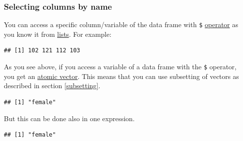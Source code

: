 \documentclass[
]{scrartcl}
\newenvironment{Shaded}{\begin{snugshade}}{\end{snugshade}}
\newcommand{\CommentTok}[1]{\textcolor[rgb]{0.56,0.35,0.01}{\textit{#1}}}
\newcommand{\DecValTok}[1]{\textcolor[rgb]{0.00,0.00,0.81}{#1}}
\newcommand{\NormalTok}[1]{#1}
\newcommand{\OperatorTok}[1]{\textcolor[rgb]{0.81,0.36,0.00}{\textbf{#1}}}
\newcommand{\StringTok}[1]{\textcolor[rgb]{0.31,0.60,0.02}{#1}}
\begin{document}
\hypertarget{selectbyname}{%
\subsubsection{Selecting columns by name}\label{selectbyname}}

You can access a specific column/variable of the data frame with \texttt{\$} \protect\hyperlink{listsdollar}{operator} as you know it from \protect\hyperlink{lists}{lists}. For example:

\begin{Shaded}
\end{Shaded}

\begin{verbatim}
## [1] 102 121 112 103
\end{verbatim}

As you see above, if you access a variable of a data frame with the \texttt{\$} operator, you get an \protect\hyperlink{vectors}{atomic vector}. This means that you can use subsetting of vectors as described in section \ref{subsetting}.

\begin{Shaded}
\end{Shaded}

\begin{verbatim}
## [1] "female"
\end{verbatim}

But this can be done also in one expression.

\begin{Shaded}
\end{Shaded}

\begin{verbatim}
## [1] "female"
\end{verbatim}
\end{document}
